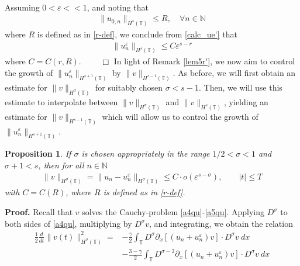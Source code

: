 \documentclass[12pt,reqno]{amsart}
\newcommand{\p}{\partial}
\newcommand{\ci}{\mathbb{T}}
\newcommand{\ee}{\varepsilon}
\theoremstyle{plain}  %
\newtheorem{proposition}{Proposition}
\theoremstyle{definition}
\begin{document}
\begin{appendices}
\begin{equation}
\begin{split}
	\end{split}
\end{equation}
Assuming $0 < \ee <<1$, and noting that
\begin{equation*}
	\begin{split}
		\|u_{0,n}\|_{H^s(\ci)} \le R, \quad \forall n \in \mathbb{N}
	\end{split}
\end{equation*}
where $R$ is defined as in \eqref{r-def},
we conclude from \eqref{calc_ue'} that 
\begin{equation*}
	\begin{split}
		\|u^\ee_n\|_{H^s(\ci)} \le C \ee^{s-r}
	\end{split}
\end{equation*}
where $C = C(r, R)$. $\qquad \Box$
%
\vskip0.1in
In light of Remark \ref{lem5r'}, we now aim to control the growth of
$\|u^\ee_n\|_{H^{s+1}(\ci)}$ by $\|v\|_{H^{s-1}(\ci)}$. As before, we will
first obtain an estimate for $\|v\|_{H^\sigma(\ci)}$ for suitably chosen
$\sigma < s-1$. Then, we will use this estimate to interpolate between
$\|v\|_{H^\sigma(\ci)}$ and $\|v\|_{H^s(\ci)}$, yielding an estimate for
$\|v\|_{H^{s-1}(\ci)}$ which will allow us to control the growth of
$\|u^\ee_n\|_{H^{s+1}(\ci)}$. 
%
%
%
%
\begin{proposition}
	\label{prop:180}
If $\sigma$ is chosen appropriately in the range $1/2 < \sigma < 1$ and
$\sigma + 1 < s$, then for all $n \in \mathbb{N}$ 
	\begin{equation}
	\label{alem6rq}
	\begin{split}
		\|v\|_{H^{\sigma}(\ci)} = 
		\|u_n - u^\ee_n\|_{H^\sigma(\ci)}
		\le C \cdot o(\ee^{s- \sigma }), \qquad |t| \le T
	\end{split}
\end{equation}
with $C = C(R)$, where $R$ is defined as in \eqref{r-def}.
\end{proposition}
%
%
%
{\bf Proof.}
Recall that $v$ solves the Cauchy-problem \eqref{a4qu}-\eqref{a5qu}.
Applying $D^\sigma$ to both sides of \eqref{a4qu}, multiplying by
$D^\sigma v$, and integrating, we obtain the
relation
\begin{equation*}
	\begin{split}
		\frac{1}{2}\frac{d}{dt}\|v(t)\|_{H^\sigma(\ci)}^2
		= & - \frac{\gamma}{2}\int_{\ci} D^\sigma
		\p_x \left[ \left( u_n + u^\ee_n \right)v
		\right]\cdot D^\sigma v \ dx
		\\
		& - \frac{3-\gamma}{2}\int_{\ci} D^{\sigma
		-2} \p_x \left[ \left( u_n + u^\ee_n
		\right)v \right] \cdot D^\sigma v \ dx

\end{split}
\end{equation*}
\end{appendices}
\end{document}

